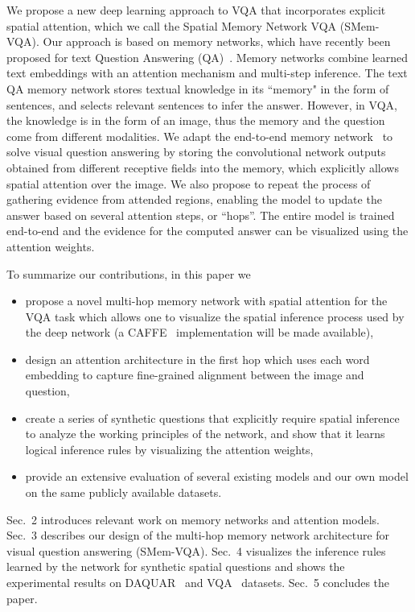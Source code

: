 We propose a new deep learning approach to VQA that incorporates explicit spatial attention, which we call the Spatial Memory Network VQA (SMem-VQA). 
Our approach is based on memory networks, which have recently been proposed for text Question Answering (QA)~\cite{DBLP:journals/corr/WestonCB14,sukhbaatar2015end}. Memory networks combine learned text embeddings with an attention mechanism and multi-step inference. 
The text QA memory network stores textual knowledge in its ``memory" in the form of sentences, and selects relevant sentences to infer the answer. However, in VQA, the knowledge is in the form of an image, thus the memory and the question come from different modalities.
We adapt the end-to-end memory network~\cite{sukhbaatar2015end} to solve visual question answering by storing the convolutional network outputs obtained from different receptive fields into the memory, which explicitly allows spatial attention over the image. We also propose to repeat the process of gathering evidence from attended regions, enabling the model to update the answer based on several attention steps, or ``hops''. The entire model is trained end-to-end and the evidence for the computed answer can be visualized using the attention weights. 

To summarize our contributions, in this paper we\vspace{-0.1in}
\begin{itemize}%
\item propose a novel multi-hop memory network with spatial attention for the VQA task which allows one to visualize the spatial inference process used by the deep network (a CAFFE~\cite{jia2014caffe} implementation will be made available), 
\item design an attention architecture in the first hop which uses each word embedding to capture fine-grained alignment between the image and question,
\item create a series of synthetic questions that explicitly require spatial inference to analyze the working principles of the network, and show that it learns logical inference rules by visualizing the attention weights,
\item provide an extensive evaluation of several existing models and our own model on the same publicly available datasets.
\end{itemize}


Sec.~2 introduces relevant work on memory networks and attention models. Sec.~3 describes our design of the multi-hop memory network architecture for visual question answering (SMem-VQA). Sec.~4  visualizes the inference rules learned by the network for synthetic spatial questions and shows the experimental results on DAQUAR~\cite{DBLP:journals/corr/MalinowskiF14} and VQA~\cite{DBLP:journals/corr/AntolALMBZP15} datasets. Sec.~5 concludes the paper.



